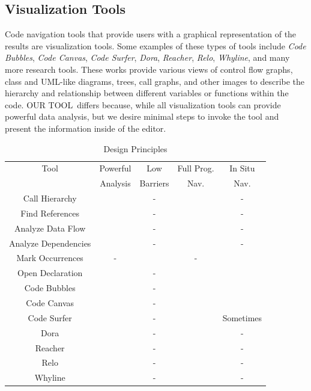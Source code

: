 \documentclass[conference]{IEEEtran}
\newcommand{\toolName}{OUR TOOL}
\begin{document}
\subsection{Visualization Tools}
Code navigation tools that provide users with a graphical representation of the results are visualization tools. Some examples of these types of tools include \emph{Code Bubbles}\cite{CodeBubbles}, \emph{Code Canvas}\cite{CodeCanvas}, \emph{Code Surfer}\cite{CodeSurfer}, \emph{Dora}\cite{Dora}, \emph{Reacher}\cite{Reacher}, \emph{Relo}\cite{Relo}, \emph{Whyline}\cite{Whyline}, and many more research tools. These works provide various views of control flow graphs, class and UML-like diagrams, trees, call graphs, and other images to describe the hierarchy and relationship between different variables or functions within the code. \toolName~differs because, while all visualization tools can provide powerful data analysis, but we desire minimal steps to invoke the tool and present the information inside of the editor.

\begin{table}
	\centering
	\caption{Design Principles}
	\begin{tabular}{|c|c|c|c|c|}
		\hline
		Tool & Powerful & Low & Full Prog. & In Situ\\
		 & Analysis & Barriers & Nav. & Nav.\\
		\hline
		Call Hierarchy & \checkmark & - & \checkmark & -\\
		\hline
		Find References & \checkmark & - & \checkmark & -\\
		\hline
		Analyze Data Flow & \checkmark & - & \checkmark & -\\
		\hline
		Analyze Dependencies & \checkmark & - & \checkmark & -\\
		\hline
		Mark Occurrences & - & \checkmark & - & \checkmark \\
		\hline
		Open Declaration & \checkmark & - & \checkmark & \checkmark \\
		\hline
		Code Bubbles & \checkmark & - & \checkmark & \checkmark \\
		\hline
		Code Canvas & \checkmark & - & \checkmark & \checkmark \\
		\hline
		Code Surfer & \checkmark & - & \checkmark & Sometimes \\
		\hline
		Dora & \checkmark & - & \checkmark & - \\
		\hline
		Reacher & \checkmark & - & \checkmark & - \\
		\hline
		Relo & \checkmark & - & \checkmark & - \\
		\hline
		Whyline & \checkmark & - & \checkmark & - \\
		\hline
	\end{tabular}
	\label{table:background}
\end{table}
\end{document}

